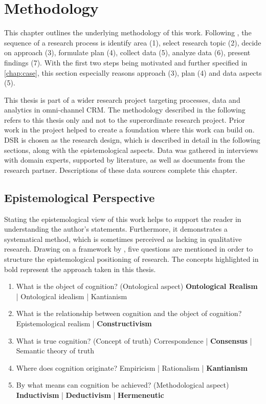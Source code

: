 \chapter{Methodology}
This chapter outlines the underlying methodology of this work. Following \cite{gilljohnson}, the sequence of a research process is identify area (1), select research topic (2), decide on approach (3), formulate plan (4), collect data (5),  analyze data (6), present findings (7). With the first two steps being motivated and further specified in \ref{chap:case}, this section especially reasons approach (3), plan (4) and data aspects (5). 

This thesis is part of a wider research project targeting processes, data and analytics in omni-channel CRM. The methodology described in the following refers to this thesis only and not to the superordinate research project. Prior work in the project helped to create a foundation where this work can build on. \acrfull{DSR} is chosen as the research design, which is described in detail in the following sections, along with the epistemological aspects. Data was gathered in interviews with domain experts, supported by literature, as well as documents from the research partner. Descriptions of these data sources complete this chapter. 


	\section{Epistemological Perspective}
	\label{sec:epis}
Stating the epistemological view of this work helps to support the reader in understanding the author's statements. Furthermore, it demonstrates a systematical method, which is sometimes perceived as lacking in qualitative research. Drawing on a framework by \cite{becker2007epistemological}, five questions are mentioned in order to structure the epistemological positioning of research. The concepts highlighted in bold represent the approach taken in this thesis. 

\begin{enumerate}
	\item What is the object of cognition? (Ontological aspect)
		\subitem \textbf{Ontological Realism} | Ontological idealism  | Kantianism
	\item What is the relationship between cognition and the object of cognition?
		\subitem Epistemological realism | \textbf{Constructivism}
	\item What is true cognition? (Concept of truth)
		\subitem Correspondence |  \textbf{Consensus} |  Semantic theory of truth
	\item Where does cognition originate?
	\subitem Empiricism | Rationalism | \textbf{Kantianism}
	\item By what means can cognition be achieved? (Methodological aspect)
		\subitem \textbf{Inductivism} | \textbf{Deductivism} | \textbf{Hermeneutic}
\end{enumerate}

